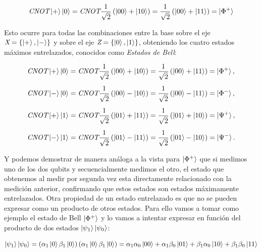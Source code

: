 \documentclass[12pt]{article}
\numberwithin{equation}{section} %
\begin{document}
    \begin{equation*}
        \textit{CNOT} \ket{+} \ket{0} = \textit{CNOT} \frac{1}{\sqrt{2}} \left( \ket{0 0} + \ket{1 0} \right) = \frac{1}{\sqrt{2}} \left( \ket{0 0} + \ket{1 1} \right) = \ket{\Phi^{+}}
    \end{equation*}

    \vspace{2.5mm}

    Esto ocurre para todas las combinaciones entre la base sobre el eje \( \textit{X} = \{ \ket{+}, \ket{-} \} \) y sobre el eje \( \textit{Z} = \{ \ket{0}, \ket{1} \} \), obteniendo los cuatro estados máximos entrelazados, conocidos como \textit{Estados de Bell}:

    \begin{align}
        \textit{CNOT} \ket{+} \ket{0} &= \textit{CNOT} \frac{1}{\sqrt{2}} \left( \ket{0 0} + \ket{1 0} \right) = \frac{1}{\sqrt{2}} \left( \ket{0 0} + \ket{1 1} \right) = \ket{\Phi^{+}}, \\[5pt]
        \textit{CNOT} \ket{-} \ket{0} &= \textit{CNOT} \frac{1}{\sqrt{2}} \left( \ket{0 0} - \ket{1 0} \right) = \frac{1}{\sqrt{2}} \left( \ket{0 0} - \ket{1 1} \right) = \ket{\Phi^{-}}, \\[5pt]
        \textit{CNOT} \ket{+} \ket{1} &= \textit{CNOT} \frac{1}{\sqrt{2}} \left( \ket{0 1} + \ket{1 1} \right) = \frac{1}{\sqrt{2}} \left( \ket{0 1} + \ket{1 0} \right) = \ket{\Psi^{+}}, \\[5pt]
        \textit{CNOT} \ket{-} \ket{1} &= \textit{CNOT} \frac{1}{\sqrt{2}} \left( \ket{0 1} - \ket{1 1} \right) = \frac{1}{\sqrt{2}} \left( \ket{0 1} - \ket{1 0} \right) = \ket{\Psi^{-}}.
        \label{eq: estados_bell}
    \end{align}

    \vspace{2.5mm}

    Y podemos demostrar de manera análoga a la vista para \( \ket{\Phi^{+}} \) que si medimos uno de los dos qubits y secuencialmente medimos el otro, el estado que obtenemos al medir por segunda vez esta directamente relacionado con la medición anterior, confirmando que estos estados son estados máximamente entrelazados. Otra propiedad de un estado entrelazado es que no se pueden expresar como un producto de otros estados. Para ello vamos a tomar como ejemplo el estado de Bell \( \ket{\Phi^{+}} \) y lo vamos a intentar expresar en función del producto de dos estados \( \ket{\psi_{1}} \ket{\psi_{0}} \):

    \begin{equation}
        \ket{\psi_{1}} \ket{\psi_{0}} = \left( \alpha_{1} \ket{0} \beta_{1} \ket{0} \right) \left( \alpha_{1} \ket{0} \beta_{1} \ket{0} \right) = \alpha_{1} \alpha_{0} \ket{0 0} + \alpha_{1} \beta_{0} \ket{0 1} + \beta_{1} \alpha_{0} \ket{1 0} + \beta_{1} \beta_{0} \ket{1 1}
    \end{equation}
\end{document}
